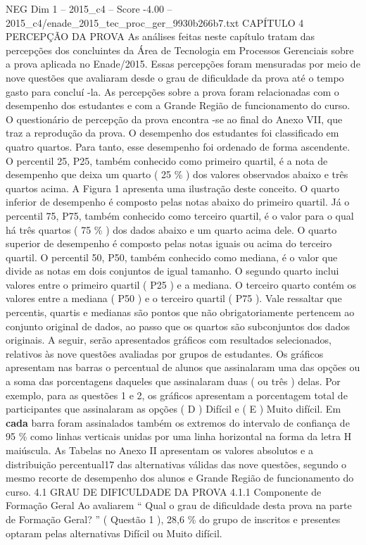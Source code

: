 \begin{textsample}{NEG Dim 1 – 2015\_c4 – Score -4.00 – 2015\_c4/enade\_2015\_tec\_proc\_ger\_9930b266b7.txt}  \label{ex:f1_neg_104}
CAPÍTULO 4 PERCEPÇÃO DA PROVA As análises feitas neste capítulo tratam das percepções dos concluintes da Área de Tecnologia em Processos Gerenciais sobre a prova aplicada no Enade/2015.
Essas percepções foram mensuradas por meio de nove questões que avaliaram desde o grau de dificuldade da prova até o tempo gasto para concluí -la.
As percepções sobre a prova foram relacionadas com o desempenho dos estudantes e com a Grande Região de funcionamento do curso.
O questionário de percepção da prova encontra -se ao final do Anexo VII, que traz a reprodução da prova.
O desempenho dos estudantes foi classificado em quatro quartos.
Para tanto, esse desempenho foi ordenado de forma ascendente.
O percentil 25, P25, também conhecido como primeiro quartil, é a nota de desempenho que deixa um quarto ( 25 \% ) dos valores observados abaixo e três quartos acima.
A Figura 1 apresenta uma ilustração deste conceito.
O quarto inferior de desempenho é composto pelas notas abaixo do primeiro quartil.
Já o percentil 75, P75, também conhecido como terceiro quartil, é o valor para o qual há três quartos ( 75 \% ) dos dados abaixo e um quarto acima dele.
O quarto superior de desempenho é composto pelas notas iguais ou acima do terceiro quartil.
O percentil 50, P50, também conhecido como mediana, é o valor que divide as notas em dois conjuntos de igual tamanho.
O segundo quarto inclui valores entre o primeiro quartil ( P25 ) e a mediana.
O terceiro quarto contém os valores entre a mediana ( P50 ) e o terceiro quartil ( P75 ).
Vale ressaltar que percentis, quartis e medianas são pontos que não obrigatoriamente pertencem ao conjunto original de dados, ao passo que os quartos são subconjuntos dos dados originais.
A seguir, serão apresentados gráficos com resultados selecionados, relativos às nove questões avaliadas por grupos de estudantes.
Os gráficos apresentam nas barras o percentual de alunos que assinalaram uma das opções ou a soma das porcentagens daqueles que assinalaram duas ( ou três ) delas.
Por exemplo, para as questões 1 e 2, os gráficos apresentam a porcentagem total de participantes que assinalaram as opções ( D ) Difícil e ( E ) Muito difícil.
Em \textbf{cada} barra foram assinalados também os extremos do intervalo de confiança de 95 \% como linhas verticais unidas por uma linha horizontal na forma da letra H maiúscula.
As Tabelas no Anexo II apresentam os valores absolutos e a distribuição percentual17 das alternativas válidas das nove questões, segundo o mesmo recorte de desempenho dos alunos e Grande Região de funcionamento do curso. 4.1 GRAU DE DIFICULDADE DA PROVA 4.1.1 Componente de Formação Geral Ao avaliarem “ Qual o grau de dificuldade desta prova na parte de Formação Geral? ” ( Questão 1 ), 28,6 \% do grupo de inscritos e presentes optaram pelas alternativas Difícil ou Muito difícil.

\end{textsample}
